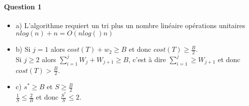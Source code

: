 \paragraph{Question 1}
\begin{itemize}
\item a) L'algorithme requiert un tri plus un nombre linéaire opérations unitaires $nlog(n) + n = O(nlog()n)$
\item b) Si $j = 1$ alors $cost(T) + w_{2} \geqslant B$ et donc $cost(T) \geqslant \frac{B}{2}$.\\
Si $j \geqslant 2$ alors $\sum_{i=1}^{j} W_{j} + W_{j+1} \geqslant B$, c'est à dire $\sum_{i=1}^{j} \geqslant W_{j+1}$ et donc $cost(T) > \frac{B}{2}$.
\item c)  $s^{*} \geqslant B$ et $S \geqslant \frac{B}{2}$\\
$\frac{1}{S} \leqslant \frac{2}{B}$ et donc $\frac{S^{*}}{S} \leqslant 2$.
\end{itemize}

